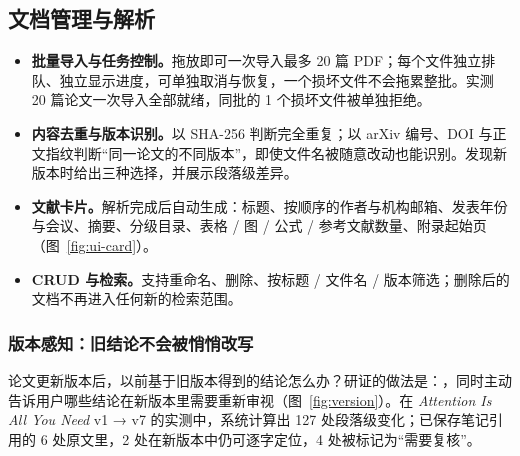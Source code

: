 \subsection{文档管理与解析}

\noindent
\begin{minipage}[t]{0.665\linewidth}\vspace{0pt}
  \label{fig:ui-library}
\end{minipage}\hfill
\begin{minipage}[t]{0.3\linewidth}\vspace{0pt}
  \label{fig:ui-card}
\end{minipage}

\vspace{4pt}
\begin{itemize}
  \item \textbf{批量导入与任务控制。}拖放即可一次导入最多 20 篇 PDF；每个文件独立排队、独立显示进度，可单独取消与恢复，一个损坏文件不会拖累整批。实测 20 篇论文一次导入全部就绪，同批的 1 个损坏文件被单独拒绝。
  \item \textbf{内容去重与版本识别。}以 SHA-256 判断完全重复；以 arXiv 编号、DOI 与正文指纹判断“同一论文的不同版本”，即使文件名被随意改动也能识别。发现新版本时给出三种选择，并展示段落级差异。
  \item \textbf{文献卡片。}解析完成后自动生成：标题、按顺序的作者与机构邮箱、发表年份与会议、摘要、分级目录、表格 / 图 / 公式 / 参考文献数量、附录起始页（图~\ref{fig:ui-card}）。
  \item \textbf{CRUD 与检索。}支持重命名、删除、按标题 / 文件名 / 版本筛选；删除后的文档不再进入任何新的检索范围。
\end{itemize}

\subsubsection{版本感知：旧结论不会被悄悄改写}

论文更新版本后，以前基于旧版本得到的结论怎么办？研证的做法是：，同时主动告诉用户哪些结论在新版本里需要重新审视（图~\ref{fig:version}）。在 \emph{Attention Is All You Need} v1 → v7 的实测中，系统计算出 127 处段落级变化；已保存笔记引用的 6 处原文里，2 处在新版本中仍可逐字定位，4 处被标记为“需要复核”。

